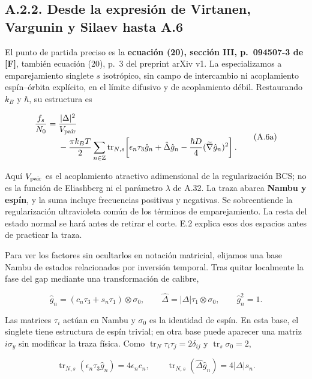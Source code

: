 \documentclass[
  spanish,
  10pt,
  a4paper,
]{article}
\begin{document}
\subsection{A.2.2. Desde la expresión de Virtanen, Vargunin y Silaev
hasta
A.6}\label{a.2.2.-desde-la-expresiuxf3n-de-virtanen-vargunin-y-silaev-hasta-a.6}

El punto de partida preciso es la \textbf{ecuación (20), sección III,
p.~094507-3 de {[}F{]}}, también ecuación (20), p.~3 del preprint arXiv
v1. La especializamos a emparejamiento singlete \(s\) isotrópico, sin
campo de intercambio ni acoplamiento espín--órbita explícito, en el
límite difusivo y de acoplamiento débil. Restaurando \(k_B\) y
\(\hbar\), su estructura es

\[
\begin{aligned}
\frac{f_s}{N_0}
={}&\frac{|\Delta|^2}{V_{\rm pair}}\\
&-\frac{\pi k_BT}{2}\sum_{n\in\mathbb Z}
\operatorname{tr}_{N,s}\!\left[
\epsilon_n\tau_3\hat g_n+\hat\Delta\hat g_n
-\frac{\hbar D}{4}(\widetilde\nabla\hat g_n)^2
\right].
\end{aligned}
\tag{A.6a}
\]

Aquí \(V_{\rm pair}\) es el acoplamiento atractivo adimensional de la
regularización BCS; no es la función de Eliashberg ni el parámetro
\(\lambda\) de A.32. La traza abarca \textbf{Nambu y espín}, y la suma
incluye frecuencias positivas y negativas. Se sobreentiende la
regularización ultravioleta común de los términos de emparejamiento. La
resta del estado normal se hará antes de retirar el corte. E.2 explica
esos dos espacios antes de practicar la traza.

Para ver los factores sin ocultarlos en notación matricial, elijamos una
base Nambu de estados relacionados por inversión temporal. Tras quitar
localmente la fase del gap mediante una transformación de calibre,

\[
\hat g_n=(c_n\tau_3+s_n\tau_1)\otimes\sigma_0,
\qquad \hat\Delta=|\Delta|\tau_1\otimes\sigma_0,
\qquad \hat g_n^2=1.
\tag{A.6b}
\]

Las matrices \(\tau_i\) actúan en Nambu y \(\sigma_0\) es la identidad
de espín. En esta base, el singlete tiene estructura de espín trivial;
en otra base puede aparecer una matriz \(i\sigma_y\) sin modificar la
traza física. Como \(\operatorname{tr}_N\tau_i\tau_j=2\delta_{ij}\) y
\(\operatorname{tr}_s\sigma_0=2\),

\[
\operatorname{tr}_{N,s}(\epsilon_n\tau_3\hat g_n)=4\epsilon_nc_n,
\qquad
\operatorname{tr}_{N,s}(\hat\Delta\hat g_n)=4|\Delta|s_n.
\tag{A.6c}
\]
\end{document}

